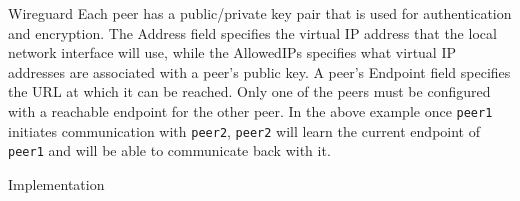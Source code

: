 \begin{frame}[fragile]{Wireguard}
Each peer has a public/private key pair that is used for authentication
and encryption. The Address field specifies the virtual IP address that
the local network interface will use, while the AllowedIPs specifies
what virtual IP addresses are associated with a peer's public key. A
peer's Endpoint field specifies the URL at which it can be reached. Only
one of the peers must be configured with a reachable endpoint for the
other peer. In the above example once \texttt{peer1} initiates
communication with \texttt{peer2}, \texttt{peer2} will learn the current
endpoint of \texttt{peer1} and will be able to communicate back with it.

\begin{block}{Implementation}
\protect\hypertarget{implementation}{}
\end{block}
\end{frame}

